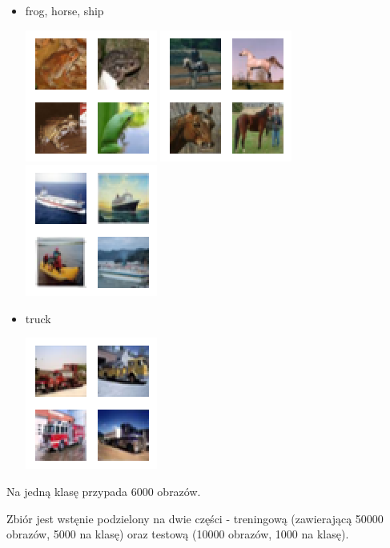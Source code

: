 \documentclass[a4paper,10pt]{report}
\begin{document}
\begin{itemize}
	\item frog, horse, ship \\
	\begin{center} \includegraphics{imgs/class_6.png} \includegraphics{imgs/class_7.png} \includegraphics{imgs/class_8.png} \end{center}

	\item truck \\
	\begin{center} \includegraphics{imgs/class_9.png} \end{center}
\end{itemize}

Na jedną klasę przypada 6000 obrazów.

Zbiór jest wstęnie podzielony na dwie części - treningową (zawierającą 50000 obrazów, 5000 na klasę) oraz testową (10000 obrazów, 1000 na klasę).
\end{document}
